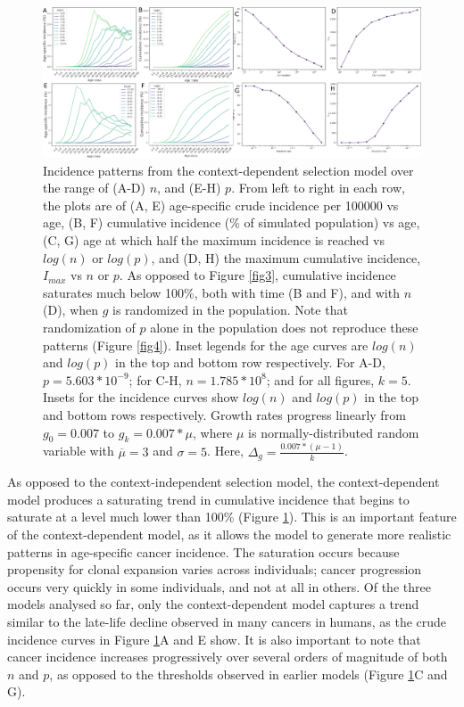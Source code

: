 \documentclass[12pt,onecolumn,twoside]{article}
\begin{document}
\begin{figure}[!h]
	\centering
	\includegraphics[width=\linewidth, keepaspectratio=true]{fig5.png}
	\caption{Incidence patterns from the context-dependent selection model over the range of (A-D) $n$, and (E-H) $p$. From left to right in each row, the plots are of (A, E) age-specific crude incidence per 100000 vs age, (B, F) cumulative incidence (\% of simulated population) vs age, (C, G) age at which half the maximum incidence is reached vs $log(n)$ or $log(p)$, and (D, H) the maximum cumulative incidence, $I_{max}$ vs $n$ or $p$. As opposed to Figure \ref{fig3}, cumulative incidence saturates much below 100\%, both with time (B and F), and with $n$ (D), when $g$ is randomized in the population. Note that randomization of $p$ alone in the population does not reproduce these patterns (Figure \ref{fig4}). Inset legends for the age curves are $log(n)$ and $log(p)$ in the top and bottom row respectively. For A-D, $p=5.603*10^{-9}$; for C-H, $n=1.785*10^{8}$; and for all figures, $k=5$. Insets for the incidence curves show $log(n)$ and $log(p)$ in the top and bottom rows respectively. Growth rates progress linearly from $g_{0}=0.007$ to $g_{k}=0.007*\mu$, where $\mu$ is normally-distributed random variable with $\overline{\mu}=3$ and $\sigma=5$. Here, $\Delta_{g}=\frac{0.007*(\mu-1)}{k}$.}
	\label{fig5}
\end{figure} 

As opposed to the context-independent selection model, the context-dependent model produces a saturating trend in cumulative incidence that begins to saturate at a level much lower than 100\% (Figure \ref{fig5}). This is an important feature of the context-dependent model, as it allows the model to generate more realistic patterns in age-specific cancer incidence. The saturation occurs because propensity for clonal expansion varies across individuals; cancer progression occurs very quickly in some individuals, and not at all in others. Of the three models analysed so far, only the context-dependent model captures a trend similar to the late-life decline observed in many cancers in humans, as the crude incidence curves in Figure \ref{fig5}A and E show. It is also important to note that cancer incidence increases progressively over several orders of magnitude of both $n$ and $p$, as opposed to the thresholds observed in earlier models (Figure \ref{fig5}C and G).
\end{document}
